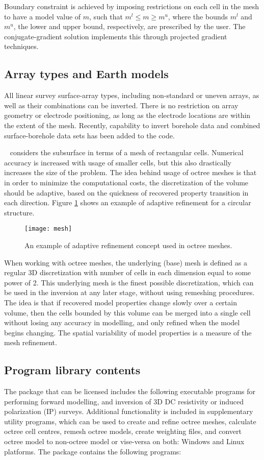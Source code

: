Boundary constraint is achieved by imposing restrictions on each cell in the mesh to have a model value of $m$, such that $m^l \leq m \geq m^u$, where the bounds $m^l$ and $m^u$, the lower and upper bound, respectively, are prescribed by the user. The conjugate-gradient solution implements this through projected gradient techniques.

\subsection{Array types and Earth models}
All linear survey surface-array types, including non-standard or uneven arrays, as well as their combinations can be inverted. There is no restriction on array geometry or electrode positioning, as long as the electrode locations are within the extent of the mesh. Recently, capability to invert borehole data and combined surface-borehole data sets has been added to the code. 

\programName~ considers the subsurface in terms of a mesh of rectangular cells. Numerical accuracy is increased with usage of smaller cells, but this also drastically increases the size of the problem. The idea behind usage of octree meshes is that in order to minimize the computational costs, the discretization of the volume should be adaptive, based on the quickness of recovered property transition in each direction. Figure \ref{fig:mesh} shows an example of adaptive refinement for a circular structure. 

\begin{figure}[!ht]
\center
\texttt{[image: mesh]}
\caption{An example of adaptive refinement concept used in octree meshes.}
\label{fig:mesh}
\end{figure}

When working with octree meshes, the underlying (base) mesh is defined as a regular 3D discretization with number of cells in each dimension equal to some power of 2. This underlying mesh is the finest possible discretization, which can be used in the inversion at any later stage, without using remeshing procedures. The idea is that if recovered model properties change slowly over a certain volume, then the cells bounded by this volume can be merged into a single cell without losing any accuracy in modelling, and only refined when the model begins changing. The spatial variability of model properties is a measure of the mesh refinement.

\subsection{Program library contents}
The package that can be licensed includes the following executable programs for performing forward modelling, and inversion of 3D DC resistivity or induced polarization (IP) surveys. Additional functionality is included in supplementary utility programs, which can be used to create and refine octree meshes, calculate octree cell centres, remesh octree models, create weighting files, and convert octree model to non-octree model or vise-versa on both: Windows and Linux platforms. The package contains the following programs:

